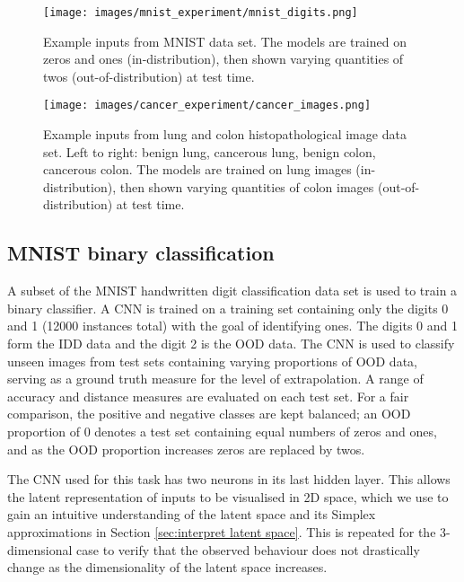 \documentclass{article}
\begin{document}
\begin{figure}[h]
  \centering
  \texttt{[image: images/mnist\_experiment/mnist\_digits.png]}
  \caption{Example inputs from MNIST data set. The models are trained on zeros and ones (in-distribution), then shown varying quantities of twos (out-of-distribution) at test time.}
  \label{mnist_inputs_image}
\end{figure}

\begin{figure}[h]
  \centering
  \texttt{[image: images/cancer\_experiment/cancer\_images.png]}
  \caption{Example inputs from lung and colon histopathological image data set. Left to right: benign lung, cancerous lung, benign colon, cancerous colon. The models are trained on lung images (in-distribution), then shown varying quantities of colon images (out-of-distribution) at test time.}
  \label{cancer_inputs_image}
\end{figure}


\subsection{MNIST binary classification}
\label{sec:mnist method}
A subset of the MNIST handwritten digit classification data set \cite{deng2012mnist} is used to train a binary classifier.
A CNN is trained on a training set containing only the digits 0 and 1 (12000 instances total) with the goal of identifying ones.
The digits 0 and 1 form the IDD data and the digit 2 is the OOD data. The CNN is used to classify unseen images from test sets containing varying proportions of OOD data, serving as a ground truth measure for the level of extrapolation.
A range of accuracy and distance measures  are evaluated on each test set.
For a fair comparison, the positive and negative classes are kept balanced; an OOD proportion of 0 denotes a test set containing equal numbers of zeros and ones, and as the OOD proportion increases zeros are replaced by twos.

The CNN used for this task has two neurons in its last hidden layer. This allows the latent representation of inputs to be visualised in 2D space, which we use to gain an intuitive understanding of the latent space and its Simplex approximations in Section \ref{sec:interpret latent space}. This is repeated for the 3-dimensional case to verify that the observed behaviour does not drastically change as the dimensionality of the latent space increases.
\end{document}
